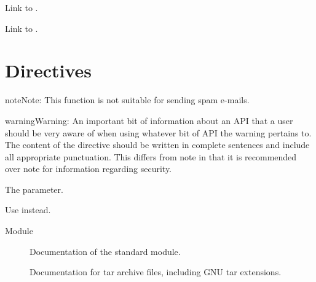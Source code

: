 \documentclass[letterpaper,10pt,english]{sphinxmanual}
\begin{document}
Link to {\hyperref[\detokenize{usage/images:images}]{}}.

Link to {\hyperref[\detokenize{usage/images:figures}]{}}.


\chapter{Directives}
\label{\detokenize{usage/directives:directives}}\label{\detokenize{usage/directives::doc}}
\begin{sphinxadmonition}{note}{Note:}
This function is not suitable for sending spam e-mails.
\end{sphinxadmonition}

\begin{sphinxadmonition}{warning}{Warning:}
An important bit of information about an API that a user should be very aware of when using whatever bit of API the warning pertains to.
The content of the directive should be written in complete sentences and include all appropriate punctuation.
This differs from note in that it is recommended over note for information regarding security.
\end{sphinxadmonition}

The  parameter.

Use  instead.



\begin{description}
\item[{Module }] \leavevmode
Documentation of the  standard module.

\item[{}] \leavevmode
Documentation for tar archive files, including GNU tar extensions.

\end{description}
\end{document}
